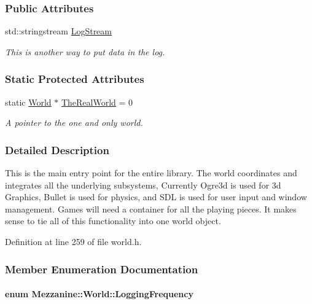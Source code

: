 \subsubsection*{Public Attributes}
\begin{DoxyCompactItemize}
\item 
std::stringstream \hyperlink{classMezzanine_1_1World_a32b1c4de1bbf5495452e463802ffa499}{LogStream}
\begin{DoxyCompactList}\small\item\em This is another way to put data in the log. \item\end{DoxyCompactList}\end{DoxyCompactItemize}
\subsubsection*{Static Protected Attributes}
\begin{DoxyCompactItemize}
\item 
\hypertarget{classMezzanine_1_1World_a86c5d362a144d6cad245fd022f512b21}{
static \hyperlink{classMezzanine_1_1World}{World} $\ast$ \hyperlink{classMezzanine_1_1World_a86c5d362a144d6cad245fd022f512b21}{TheRealWorld} = 0}
\label{classMezzanine_1_1World_a86c5d362a144d6cad245fd022f512b21}

\begin{DoxyCompactList}\small\item\em A pointer to the one and only world. \item\end{DoxyCompactList}\end{DoxyCompactItemize}


\subsubsection{Detailed Description}
This is the main entry point for the entire library. The world coordinates and integrates all the underlying subsystems, Currently Ogre3d is used for 3d Graphics, Bullet is used for physics, and SDL is used for user input and window management. Games will need a container for all the playing pieces. It makes sense to tie all of this functionality into one world object. 

Definition at line 259 of file world.h.



\subsubsection{Member Enumeration Documentation}
\hypertarget{classMezzanine_1_1World_a535c832832bbdebcdc623c3472a32e25}{
\paragraph[{LoggingFrequency}]{\setlength{\rightskip}{0pt plus 5cm}enum {\bf Mezzanine::World::LoggingFrequency}}\hfill}
\label{classMezzanine_1_1World_a535c832832bbdebcdc623c3472a32e25}


